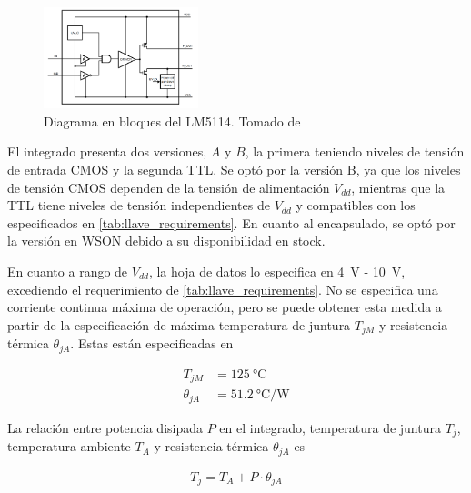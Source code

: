 \begin{figure}[tbp]
    \centering
    \includegraphics[width=0.4\textwidth]{images/lm5114_block_diagram.png}
    \caption{Diagrama en bloques del LM5114. Tomado de \cite{LM5114_datasheet}}
    \label{fig:lm5114_block_diagram}
\end{figure}

El integrado presenta dos versiones, $A$ y $B$, la primera teniendo niveles de
tensión de entrada CMOS y la segunda TTL.  Se optó por la versión B, ya que los
niveles de tensión CMOS dependen de la tensión de alimentación $V_{dd}$,
mientras que la TTL tiene niveles de tensión independientes de $V_{dd}$ y
compatibles con los especificados en \ref{tab:llave_requirements}. En cuanto al
encapsulado, se optó por la versión en WSON debido a su disponibilidad en
stock.

En cuanto a rango de $V_{dd}$, la hoja de datos lo especifica en \qty{4}{\volt}
- \qty{10}{\volt}, excediendo el requerimiento de \ref{tab:llave_requirements}.
No se especifica una corriente continua máxima de operación, pero se puede
obtener esta medida a partir de la especificación de máxima temperatura de
juntura $T_{jM}$ y resistencia térmica $\theta_{jA}$. Estas están especificadas en

\begin{equation}
    \begin{aligned}
        T_{jM} & = \qty{125}{\celsius} \\
        \theta_{jA} &= \qty[per-mode=fraction]{51.2}{\celsius\per\watt}
    \end{aligned}
\end{equation}

La relación entre potencia disipada $P$ en el integrado, temperatura de juntura
$T_j$, temperatura ambiente $T_A$ y resistencia térmica $\theta_{jA}$ es

\begin{equation}
    \begin{aligned}
        T_{j} = T_{A} + P \cdot \theta_{jA}
    \end{aligned}
\end{equation}

